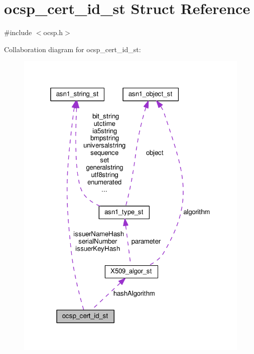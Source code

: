 \hypertarget{structocsp__cert__id__st}{}\section{ocsp\+\_\+cert\+\_\+id\+\_\+st Struct Reference}
\label{structocsp__cert__id__st}


{\ttfamily \#include $<$ocsp.\+h$>$}



Collaboration diagram for ocsp\+\_\+cert\+\_\+id\+\_\+st\+:
\nopagebreak
\begin{figure}[H]
\begin{center}
\leavevmode
\includegraphics[width=319pt]{structocsp__cert__id__st__coll__graph}
\end{center}
\end{figure}
